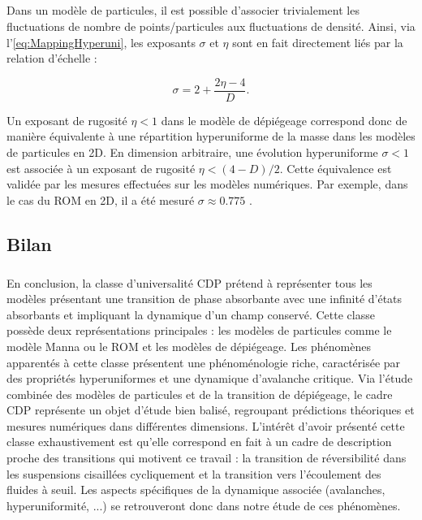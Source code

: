 \subparagraph{}Dans un modèle de particules, il est possible d'associer trivialement les fluctuations de nombre de points/particules aux fluctuations de densité. Ainsi, via l'\autoref{eq:MappingHyperuni}, les exposants $\sigma$ et $\eta$ sont en fait directement liés par la relation d'échelle :

\begin{equation}
	\sigma = 2 + \frac{2\eta - 4}{D}.
	\label{eq:rel_eta_sigma}
\end{equation}

\noindent Un exposant de rugosité $\eta < 1$ dans le modèle de dépiégeage correspond donc de manière équivalente à une répartition hyperuniforme de la masse dans les modèles de particules en 2D. En dimension arbitraire, une évolution hyperuniforme $\sigma < 1$ est associée à un exposant de rugosité $\eta < (4-D)/2$. Cette équivalence est validée par les mesures effectuées sur les modèles numériques. Par exemple, dans le cas du ROM en 2D, il a été mesuré $\sigma \approx 0.775$ \cite{tjhung_hyperuniform_2015, hexner_hyperuniformity_2015, weijs_emergent_2015}.

\subsection{Bilan}

\subparagraph{}En conclusion, la classe d'universalité CDP prétend à représenter tous les modèles présentant une transition de phase absorbante avec une infinité d'états absorbants et impliquant la dynamique d'un champ conservé. Cette classe possède deux représentations principales : les modèles de particules comme le modèle Manna ou le ROM et les modèles de dépiégeage. Les phénomènes apparentés à cette classe présentent une phénoménologie riche, caractérisée par des propriétés hyperuniformes et une dynamique d'avalanche critique. Via l'étude combinée des modèles de particules et de la transition de dépiégeage, le cadre CDP représente un objet d'étude bien balisé, regroupant prédictions théoriques et mesures numériques dans différentes dimensions. L'intérêt d'avoir présenté cette classe exhaustivement est qu'elle correspond en fait à un cadre de description proche des transitions qui motivent ce travail : la transition de réversibilité dans les suspensions cisaillées cycliquement et la transition vers l'écoulement des fluides à seuil. Les aspects spécifiques de la dynamique associée (avalanches, hyperuniformité, ...) se retrouveront donc dans notre étude de ces phénomènes.

